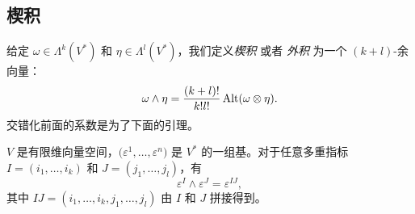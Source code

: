 \subsection{楔积}

给定 $\omega\in \Lambda^k(V^*)$ 和 $\eta\in \Lambda^l(V^*)$，我们定义\emph{楔积}
或者 \emph{外积} 为一个 $(k+l)$-余向量：
\begin{equation}
  \omega\wedge\eta=\frac{(k+l)!}{k!l!}\operatorname{Alt}(\omega\otimes\eta).
\end{equation}
交错化前面的系数是为了下面的引理。

\begin{lemma}\label{lemma:wedge}
  $V$ 是有限维向量空间，$\bigl(\varepsilon^1,\dots,\varepsilon^n\bigr)$
  是 $V^*$ 的一组基。对于任意多重指标 $I=(i_1,\dots,i_k)$ 和
  $J=(j_1,\dots,j_l)$，有
  \[
    \varepsilon^I\wedge\varepsilon^J=\varepsilon^{IJ},  
  \]
  其中 $IJ=(i_1,\dots,i_k,j_1,\dots,j_l)$ 由 $I$ 和 $J$ 拼接得到。
\end{lemma} 
